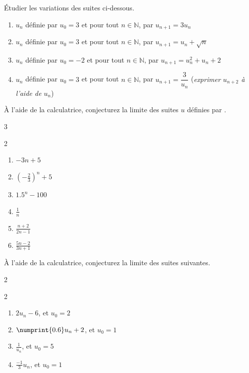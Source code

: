 \documentclass[main.tex]{subfiles}
\begin{document}
\begin{exercise} Étudier les variations des suites ci-dessous.
\begin{enumerate}[label={\arabic*)}, leftmargin=*]
		\item $u_{n}$ définie par $u_0=3$ et  pour tout $n \in \mathbb{N}$, par $u_{n+1}=3u_n$
	\item $u_{n}$ définie par $u_0=3$ et  pour tout $n \in \mathbb{N}$, par $u_{n+1}=u_n+\sqrt{n}$
	\item $u_{n}$ définie par $u_0=-2$ et  pour tout $n \in \mathbb{N}$, par $u_{n+1}=u_n^2+u_n+2$
	\item $u_{n}$ définie par $u_0=3$ et pour tout $n \in \mathbb{N}$, par $u_{n+1}=\dfrac{3}{u_n}$ (\emph{exprimer $u_{n+2}$ à l'aide de $u_n$})
\end{enumerate} 
\end{exercise} 
\begin{exercise} À l'aide de la calculatrice, conjecturez la limite des suites $u$ définies par .
	\begin{multicols}{3}
	\begin{spacing}{2} 
		\begin{enumerate}[label={\arabic*)$u_n=$}, leftmargin=*]
			\item $-3n+5$ 
			\item $\left(-\frac{2}{3}\right)^n+5$ 
			\item $1.5^n-100$   
			\item $ \frac{1}{n}$  
			\item $ \frac{n+2}{2n-1}$  
			\item $ \frac{5n-2}{3n+1}$  
		\end{enumerate} 
	\end{spacing}
\end{multicols} 
\end{exercise}
\begin{exercise} À l'aide de la calculatrice, conjecturez la limite des suites suivantes.
	\begin{multicols}{2}
		\begin{spacing}{2} 
			\begin{enumerate}[label={\arabic*)$u_{n+1}=$}, leftmargin=*]
				\item $2u_n-6$, et $u_0=2$
				\item $\numprint{0.6}u_n+2$, et $u_0=1$
				\item $\frac{1}{u_n}$, et $u_0=5$
				\item $\frac{-1}{3}u_n$, et $u_0=1$
			\end{enumerate} 
		\end{spacing}
	\end{multicols} 
\end{exercise}
\end{document}
